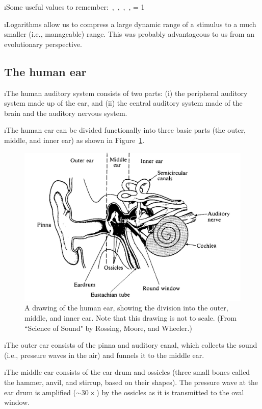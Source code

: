 \i Some useful values to remember:
%
\be
{} \,,\quad
{} \,,\quad
{} \,,\quad
{} \,,\quad
{} = 1
\ee
%

\i Logarithms allow us to compress a large dynamic range 
of a stimulus to a much smaller (i.e., manageable) range.
This was probably advantageous to us from an evolutionary
perspective.

\ei
\subsection{The human ear}
\bi

\i The human auditory system consists of two parts: 
(i) the peripheral auditory system made up of the ear, and
(ii) the central auditory system made of the brain and the
auditory nervous system.

\i The human ear can be divided functionally into 
three basic parts
(the outer, middle, and inner ear) as shown in 
Figure~\ref{f:human-ear-diagram}.
%
\begin{figure}[htbp]
\begin{center}
\includegraphics[width=.8\textwidth]{human-ear-diagram.jpg}
\caption{A drawing of the human ear, showing the division into
the outer, middle, and inner ear.  
Note that this drawing is not to scale.
(From ``Science of Sound" by Rossing, Moore, and Wheeler.)}
\label{f:human-ear-diagram}
\end{center}
\end{figure}
%

\i The outer ear consists of the pinna and auditory canal,
which collects the sound (i.e., pressure waves in the air)
and funnels it to the middle ear.

\i The middle ear consists of the ear drum and ossicles
(three small bones called the hammer, anvil, and stirrup,
based on their shapes).
The pressure wave at the ear drum is amplified ($\sim 30\times$) 
by the ossicles as it is transmitted to the oval window.
 
